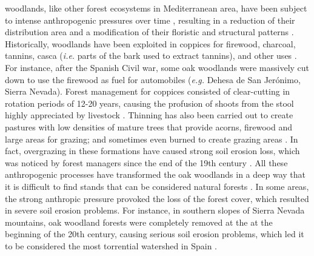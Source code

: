 \Qp woodlands, like other forest ecosystems in Mediterranean area, have been subject to intense anthropogenic pressures over time \autocite{GarciaJimenez20099230Robledales}, resulting in a reduction of their distribution area and a modification of their floristic \autocites{Serradaetal1992CoppiceSystem,Gavilanetal2000EffectsDisturbance,PerezLuqueetal2021EcologicalDiversity} and structural patterns \autocites{Calvoetal1999PostfireSuccession,Tarregaetal2006ForestStructure}. Historically, \Qp woodlands have been exploited in coppices for firewood, charcoal, tannins, casca (\emph{i.e.} parts of the bark used to extract tannins), and other uses \autocites{RuizdelaTorre2006FloraMayor,SanchezPalomaresetal2008EstacionesEcologicas}. For instance, after the Spanish Civil war, some oak woodlands were massively cut down to use the firewood as fuel for automobiles (\emph{e.g.} Dehesa de San Jerónimo, Sierra Nevada)\autocite{Prieto1975BosquesSierra}. Forest management for \Qp coppices consisted of clear-cutting in rotation periods of 12-20 years, causing the profusion of shoots from the stool highly appreciated by livestock \autocite{Bravoetal2008SelviculturaMontes}. Thinning has also been carried out to create pastures with low densities of mature trees that provide acorns, firewood and large areas for grazing; and sometimes even burned to create grazing areas \autocites{HerreraCalvo2016UsoPastoral,Alvarezetal2009CambiosEstructura,ValbuenaCarabanaGil2017CentenaryCoppicing}. In fact, overgrazing in these formations have caused strong soil erosion loss, which was noticed by forest managers since the end of the 19th century \autocites{Laguna1872ComisionFlora}. All these anthropogenic processes have transformed the oak woodlands in a deep way that it is difficult to find stands that can be considered natural forests \autocites{RuizdelaTorre2006FloraMayor}. In some areas, the strong anthropic pressure provoked the loss of the forest cover, which resulted in severe soil erosion problems. For instance, in southern slopes of Sierra Nevada mountains, oak woodland forests were completely removed at the at the beginning of the 20th century, causing serious soil erosion problems, which led it to be considered the most torrential watershed in Spain \autocites{RomeroZurbano1909DivisionHidrologicoforestal}. 
  
